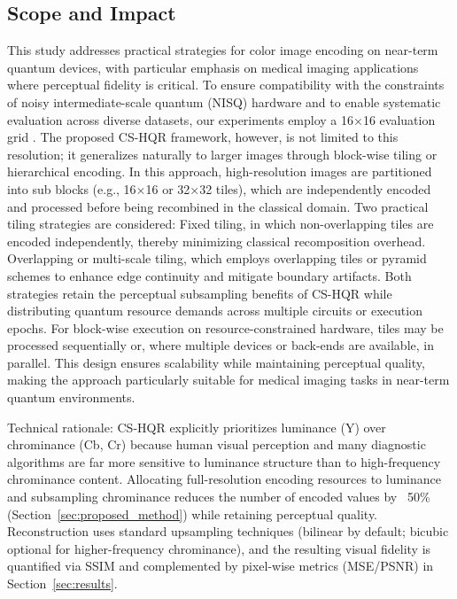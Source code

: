\documentclass[11pt,a4paper]{article}
\begin{document}
\vspace{1em}

\subsection{Scope and Impact}
\label{subsec:scope}

This study addresses practical strategies for color image encoding on near-term quantum devices, with particular emphasis on medical imaging applications where perceptual fidelity is critical. To ensure compatibility with the constraints of noisy intermediate-scale quantum (NISQ) hardware and to enable systematic evaluation across diverse datasets, our experiments employ a 16×16 evaluation grid \cite{ref4}. The proposed CS-HQR framework, however, is not limited to this resolution; it generalizes naturally to larger images through block-wise tiling or hierarchical encoding. In this approach, high-resolution images are partitioned into sub blocks (e.g., 16×16 or 32×32 tiles), which are independently encoded and processed before being recombined in the classical domain. Two practical tiling strategies are considered:
Fixed tiling, in which non-overlapping tiles are encoded independently, thereby minimizing classical recomposition overhead. Overlapping or multi-scale tiling, which employs overlapping tiles or pyramid schemes to enhance edge continuity and mitigate boundary artifacts\cite{ref22}.
Both strategies retain the perceptual subsampling benefits of CS-HQR while distributing quantum resource demands across multiple circuits or execution epochs. For block-wise execution on resource-constrained hardware, tiles may be processed sequentially or, where multiple devices or back-ends are available, in parallel. This design ensures scalability while maintaining perceptual quality, making the approach particularly suitable for medical imaging tasks in near-term quantum environments.

Technical rationale: CS-HQR explicitly prioritizes luminance (Y) over chrominance (Cb, Cr) because human visual perception and many diagnostic algorithms are far more sensitive to luminance structure than to high-frequency chrominance content. Allocating full-resolution encoding resources to luminance and subsampling chrominance reduces the number of encoded values by ~50\%
(Section~\ref{sec:proposed_method}) while retaining perceptual quality. Reconstruction uses standard upsampling techniques (bilinear by default; bicubic optional for higher-frequency chrominance), and the resulting visual fidelity is quantified via SSIM and complemented by pixel-wise metrics (MSE/PSNR) in Section~\ref{sec:results}.
\end{document}
